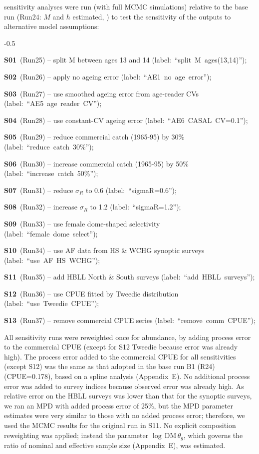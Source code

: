 \documentclass[11pt]{book}
\newcommand{\AppEqn}{Appendix~E}
\newcommand{\pc}{\%}
\begin{document}
 sensitivity analyses were run (with full MCMC simulations) relative to the base run (Run24: $M$ and $h$ estimated, ) to test the sensitivity of the outputs to alternative model assumptions:
\begin{itemize_csas}{-0.5}{}
  \item \textbf{S01}~(Run25)  -- split M between ages 13 and 14  (label:~``split~M~ages(13,14)'');
  \item \textbf{S02}~(Run26)  -- apply no ageing error  (label:~``AE1~no~age~error'');
  \item \textbf{S03}~(Run27)  -- use smoothed ageing error from age-reader CVs  (label:~``AE5~age~reader~CV'');
  \item \textbf{S04}~(Run28)  -- use constant-CV ageing error  (label:~``AE6~CASAL~CV=0.1'');
  \item \textbf{S05}~(Run29)  -- reduce commercial catch (1965-95) by 30\pc{}  (label:~``reduce~catch~30\pc{}'');
  \item \textbf{S06}~(Run30)  -- increase commercial catch (1965-95) by 50\pc{}  (label:~``increase~catch~50\pc{}'');
  \item \textbf{S07}~(Run31)  -- reduce $\sigma_R$ to 0.6  (label:~``sigmaR=0.6'');
  \item \textbf{S08}~(Run32)  -- increase $\sigma_R$ to 1.2  (label:~``sigmaR=1.2'');
  \item \textbf{S09}~(Run33)  -- use female dome-shaped selectivity  (label:~``female~dome~select'');
  \item \textbf{S10}~(Run34) -- use AF data from HS \& WCHG synoptic surveys (label:~``use~AF~HS~WCHG'');
  \item \textbf{S11}~(Run35) -- add HBLL North \& South surveys (label:~``add~HBLL~surveys'');
  \item \textbf{S12}~(Run36) -- use CPUE fitted by Tweedie distribution (label:~``use~Tweedie~CPUE'');
  \item \textbf{S13}~(Run37) -- remove commercial CPUE series (label:~``remove~comm~CPUE'');
\end{itemize_csas}

All sensitivity runs were reweighted once for abundance, by adding process error to the commercial CPUE (except for S12 Tweedie because error was already high). 
The process error added to the commercial CPUE for all sensitivities (except S12) was the same as that adopted in the base run B1 (R24) (CPUE=0.178), based on a spline analysis (\AppEqn).
No additional process error was added to survey indices because observed error was already high.
As relative error on the HBLL surveys was lower than that for the synoptic surveys, we ran an MPD with added process error of 25\pc{}, but the MPD parameter estimates were very similar to those with no added process error; therefore, we used the MCMC results for the original run in S11.
No explicit composition reweighting was applied; instead the parameter $\log\,\text{DM}\,\theta_g$, which governs the ratio of nominal and effective sample size (\AppEqn),  was estimated.
\end{document}
